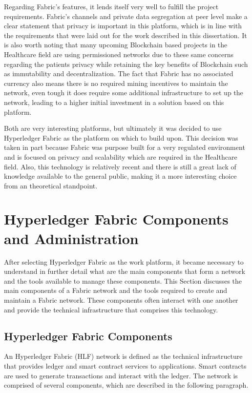 Regarding Fabric's features, it lends itself very well to fulfill the project
requirements. Fabric's channels and private data segregation at peer level make
a clear statement that privacy is important in this platform, which is in line
with the requirements that were laid out for the work described in this
dissertation. It is also worth noting that many upcoming Blockchain based
projects in the Healthcare field are using permissioned networks due to these
same concerns regarding the patients privacy while retaining the key benefits
of Blockchain such as immutability and decentralization. The fact that Fabric
has no associated currency also means there is no required mining incentives to
maintain the network, even tough it does require some additional infrastructure
to set up the network, leading to a higher initial investment in a solution
based on this platform.

Both are very interesting platforms, but ultimately it was decided to use
Hyperledger Fabric as the platform on which to build upon. This decision was
taken in part because Fabric was purpose built for a very regulated environment
and is focused on privacy and scalability which are required in the Healthcare
field. Also, this technology is relatively recent and there is still a great
lack of knowledge available to the general public, making it a more interesting
choice from an theoretical standpoint.

\section{Hyperledger Fabric Components and Administration}

After selecting Hyperledger Fabric as the work platform, it became necessary to
understand in further detail what are the main components that form a network
and the tools available to manage these components. This Section discusses the
main components of a Fabric network and the tools required to create and
maintain a Fabric network. These components often interact with one another and
provide the technical infrastructure that comprises this technology.

\subsection{Hyperledger Fabric Components}

An Hyperledger Fabric (HLF) network is defined as the technical infrastructure
that provides ledger and smart contract services to applications. Smart
contracts are used to generate transactions and interact with the ledger. The
network is comprised of several components, which are described in the
following paragraph.

